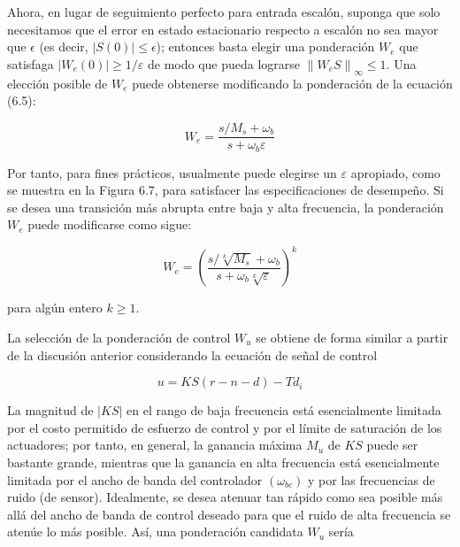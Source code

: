 
Ahora, en lugar de seguimiento perfecto para entrada escalón, suponga que solo necesitamos que el error en estado estacionario respecto a escalón no sea mayor que $\epsilon$ (es decir, $|S(0)| \leq \epsilon$); entonces basta elegir una ponderación $W_{e}$ que satisfaga $\left|W_{e}(0)\right| \geq 1 / \varepsilon$ de modo que pueda lograrse $\left\|W_{e} S\right\|_{\infty} \leq 1$. Una elección posible de $W_{e}$ puede obtenerse modificando la ponderación de la ecuación (6.5):


\begin{equation*}
W_{e}=\frac{s / M_{s}+\omega_{b}}{s+\omega_{b} \varepsilon} \tag{6.6}
\end{equation*}


Por tanto, para fines prácticos, usualmente puede elegirse un $\varepsilon$ apropiado, como se muestra en la Figura 6.7, para satisfacer las especificaciones de desempeño. Si se desea una transición más abrupta entre baja y alta frecuencia, la ponderación $W_{e}$ puede modificarse como sigue:


\begin{equation*}
W_{e}=\left(\frac{s / \sqrt[k]{M_{s}}+\omega_{b}}{s+\omega_{b} \sqrt[k]{\varepsilon}}\right)^{k} \tag{6.7}
\end{equation*}


para algún entero $k \geq 1$.

La selección de la ponderación de control $W_{u}$ se obtiene de forma similar a partir de la discusión anterior considerando la ecuación de señal de control

$$
u=K S(r-n-d)-T d_{i}
$$

La magnitud de $|K S|$ en el rango de baja frecuencia está esencialmente limitada por el costo permitido de esfuerzo de control y por el límite de saturación de los actuadores; por tanto, en general, la ganancia máxima $M_{u}$ de $K S$ puede ser bastante grande, mientras que la ganancia en alta frecuencia está esencialmente limitada por el ancho de banda del controlador $\left(\omega_{b c}\right)$ y por las frecuencias de ruido (de sensor). Idealmente, se desea atenuar tan rápido como sea posible más allá del ancho de banda de control deseado para que el ruido de alta frecuencia se atenúe lo más posible. Así, una ponderación candidata $W_{u}$ sería


